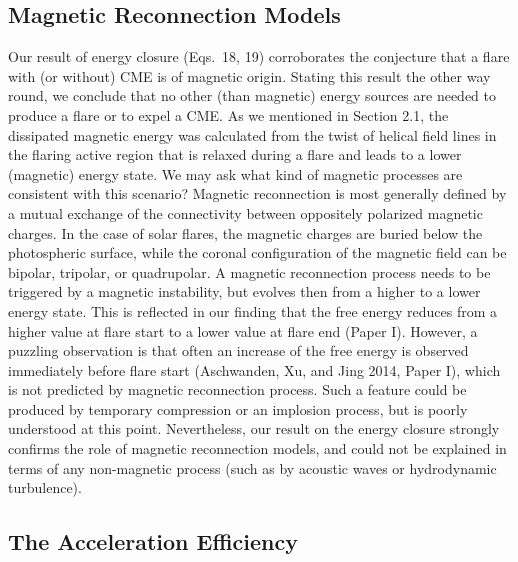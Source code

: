 \documentclass[10pt,preprint]{aastex}  %
\begin{document}
\subsection{	Magnetic Reconnection Models  		}

Our result of energy closure (Eqs.~18, 19) corroborates the 
conjecture that a flare with (or without) CME is of magnetic origin.
Stating this result the other way round, we conclude that no
other (than magnetic) energy sources are needed to produce a flare 
or to expel a CME. As we mentioned in Section 2.1, the dissipated
magnetic energy was calculated from the twist of helical field 
lines in the flaring active region that is relaxed during a flare
and leads to a lower (magnetic) energy state. We may ask what kind
of magnetic processes are consistent with this scenario? Magnetic
reconnection is most generally defined by a mutual exchange of
the connectivity between oppositely polarized magnetic charges.
In the case of solar flares, the magnetic charges are buried
below the photospheric surface, while the coronal configuration
of the magnetic field can be bipolar, tripolar, or quadrupolar.
A magnetic reconnection process needs to be triggered by a
magnetic instability, but evolves then from a higher to a lower
energy state. This is reflected in our finding that the free
energy reduces from a higher value at flare start to a lower
value at flare end (Paper I). However, a puzzling observation
is that often an increase of the free energy is observed 
immediately before flare start (Aschwanden, Xu, and Jing 2014, 
Paper I), which is not predicted by 
magnetic reconnection process. Such a feature could be produced
by temporary compression or an implosion process, but is poorly
understood at this point. Nevertheless, our result on the energy
closure strongly confirms the role of magnetic reconnection models,
and could not be explained in terms of any non-magnetic process
(such as by acoustic waves or hydrodynamic turbulence).

\subsection{	The Acceleration Efficiency 		}
\end{document}
